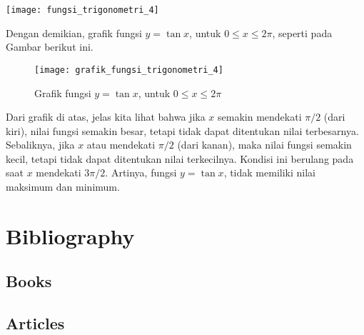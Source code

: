 \documentclass[11pt,fleqn]{book} %
\begin{document}
\begin{enumerate}
\texttt{[image: fungsi\_trigonometri\_4]}

Dengan demikian, grafik fungsi $y = \tan x$, untuk $0 \leq x\leq 2\pi$, seperti pada Gambar berikut ini.\\

\begin{figure}[!ht]
\begin{center}
\texttt{[image: grafik\_fungsi\_trigonometri\_4]} 
\caption{Grafik fungsi $y = \tan x$, untuk $0 \leq x\leq 2\pi$}
\end{center}
\end{figure}

Dari grafik di atas, jelas kita lihat bahwa jika $x$ semakin mendekati $\pi/2$ (dari kiri), nilai fungsi semakin besar, tetapi tidak dapat ditentukan nilai terbesarnya. Sebaliknya, jika $x$ atau mendekati $\pi/2$ (dari kanan), maka nilai fungsi semakin kecil, tetapi tidak dapat ditentukan nilai terkecilnya. Kondisi ini berulang pada saat $x$ mendekati $3\pi/2$. Artinya, fungsi $y = \tan x$, tidak memiliki nilai maksimum dan minimum.
\end{enumerate}

\chapter*{Bibliography}
\section*{Books}
\printbibliography[heading=bibempty,type=book]
\section*{Articles}
\printbibliography[heading=bibempty,type=article]


\cleardoublepage
{}
\setlength{\columnsep}{0.75cm}
\printindex

\end{document}
